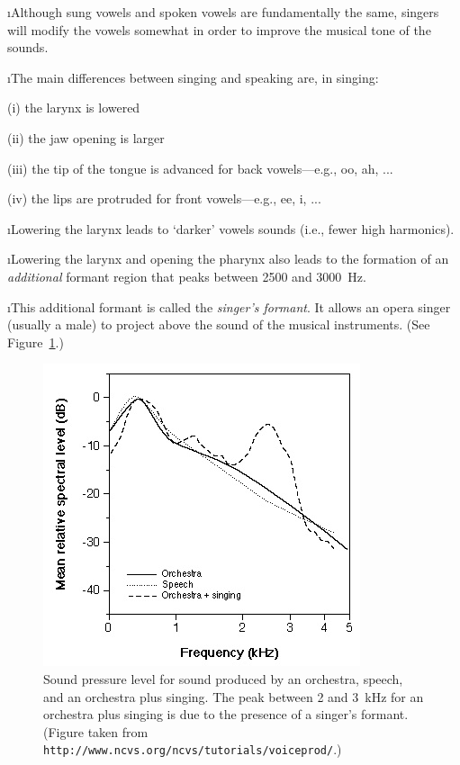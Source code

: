 \i Although sung vowels and spoken vowels are 
fundamentally the same, singers will modify the 
vowels somewhat in order to improve the musical 
tone of the sounds.

\i The main differences between singing and 
speaking are, in singing:

(i) the larynx is lowered

(ii) the jaw opening is larger

(iii) the tip of the tongue is advanced 
for back vowels---e.g., oo, ah, ...

(iv) the lips are protruded for front
vowels---e.g., ee, i, ...

\i Lowering the larynx leads to `darker' vowels
sounds (i.e., fewer high harmonics).

\i Lowering the larynx and opening the pharynx
also leads to the formation of an {\em additional}
formant region that peaks between 2500 and 3000~Hz.

\i This additional formant is called the
{\em singer's formant}.
It allows an opera singer (usually a male) 
to project above the sound of the musical 
instruments.
(See Figure~\ref{f:singersformant}.)
%
\begin{figure}[htbp]
\begin{center}
\includegraphics[width=.8\textwidth]{singersformant}
\caption{Sound pressure level for sound produced
by an orchestra, speech, and an 
orchestra plus singing.
The peak between 2 and 3~kHz for an orchestra plus 
singing is due to the presence of a singer's formant.  
(Figure taken from
{\tt http://www.ncvs.org/ncvs/tutorials/voiceprod/}.)}
\label{f:singersformant}
\end{center}
\end{figure}
%

